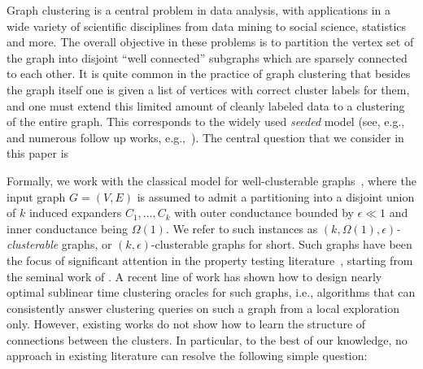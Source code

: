 \documentclass[letterpaper,11pt]{article}
\theoremstyle{plain}
\theoremstyle{definition}
\theoremstyle{remark}
\newcommand{\e}{\epsilon}
\begin{document}
Graph clustering is a central problem in data analysis, with applications in a wide variety of scientific disciplines from data mining to social science, statistics and more. The overall objective in these problems is to partition
the vertex set of the graph into disjoint ``well connected'' subgraphs which are sparsely connected to each other.  It is quite common in the practice of graph clustering that besides the graph itself one is given a list of vertices with correct cluster labels for them, and one must extend this limited amount of cleanly labeled data to a clustering of the entire graph. This corresponds to the widely used {\em seeded} model (see, e.g.,~\cite{basu2002semi} and numerous follow up works, e.g.,~\cite{demiriz1999semi, kulis2009semi, sinkkonen2002clustering, AshtianiB15}). The central question that we consider in this paper is 

\vspace{0.05in}

\vspace{0.05in}

Formally, we work with the classical model for well-clusterable graphs~\cite{CzumajPS15}, where the input graph $G = (V, E)$ is assumed to admit a partitioning into a disjoint union of $k$ induced expanders $C_1,\ldots, C_k$ with outer conductance bounded by $\epsilon\ll 1$ and inner conductance being $\Omega(1)$. We refer to such instances as \textit{$(k, \Omega(1), \e)$-clusterable}  graphs, or $(k, \e)$-clusterable  graphs for short. Such graphs have been the focus of significant attention in the property testing literature~\cite{CzumajS07,KaleS08,NachmiasS10}, starting from the seminal work of \cite{GoldreichR11}. A recent line of work has shown how to design nearly optimal sublinear time clustering oracles for such graphs, i.e., algorithms that can consistently answer clustering queries on such a graph from a local exploration only. However, existing works do not show how to learn the structure of connections between the clusters. In particular, to the best of our knowledge, no approach in existing literature can resolve the following simple question:

\vspace{0.05in}

\end{document}
